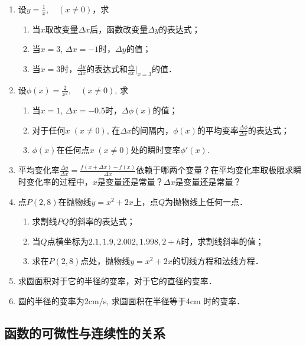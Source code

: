 \begin{ex}
\begin{enumerate}
    \item 设$y=\frac{1}{x},\quad (x\ne 0)$，求
\begin{enumerate}
    \item 当$x$取改变量$\Delta x$后，函数改变量$\Delta y$的表达式；
    \item 当$x=3$, $\Delta x=-1$时，$\Delta y$的值；
    \item 当$x=3$时，$\frac{\Delta y}{\Delta x}$的表达式和$\frac{\dd y}{\dd x}\Big|_{x=3}$的值．
\end{enumerate}

    \item 设$\phi(x)=\frac{2}{x^2},\quad (x\ne0)$, 求
\begin{enumerate}
\item 当$x=1$, $\Delta x=-0.5$时，$\Delta \phi(x)$的值；
\item 对于任何$x\; (x\ne 0)$, 在$\Delta x$的间隔内，$\phi(x)$的平均变率$\frac{\Delta \phi}{\Delta x}$的表达式；
\item $\phi(x)$在任何点$x\; (x\ne 0)$处的瞬时变率$\phi'(x)$.
\end{enumerate}

    \item 平均变化率$\frac{\Delta y}{\Delta x}=\frac{f (x+\Delta x) -f (x)}{\Delta x}$依赖于哪两个变量？在平均变化率取极限求瞬时变化率的过程中，$x$是变量还是常量？$\Delta x$是变量还是常量？
    \item 点$P(2, 8)$在抛物线$y=x^2+2x$上，点$Q$为抛物线上任何一点．
\begin{enumerate}
    \item 求割线$PQ$的斜率的表达式；
  \item 当$Q$点横坐标为$2.1, 1.9, 2.002, 1.998, 2+h$时，求割线斜率的值；
\item 求在$P(2, 8)$点处，抛物线$y=x^2+2x$的切线方程和法线方程．
\end{enumerate}    

\item 求圆面积对于它的半径的变率，对于它的直径的变率．
\item 圆的半径的变率为2cm/s, 求圆面积在半径等于4cm
时的变率．
\end{enumerate}
\end{ex}

\subsection{函数的可微性与连续性的关系}

